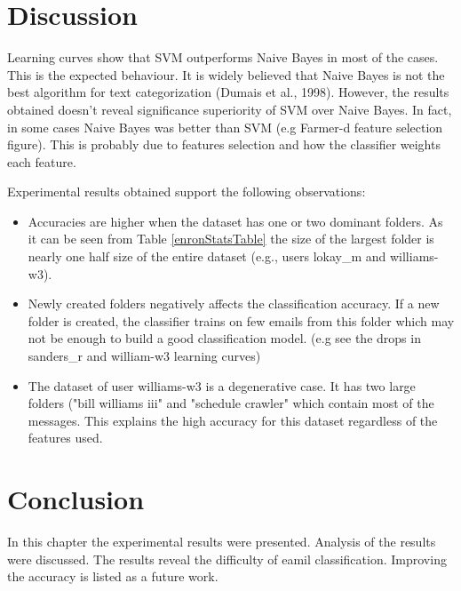 \section{Discussion}
Learning curves show that SVM outperforms Naive Bayes in most of the cases. This is the expected behaviour. It is widely believed that Naive Bayes is not the best algorithm for text categorization (Dumais et al., 1998)\cite{DHS98}.
However, the results obtained doesn't reveal significance superiority of SVM over Naive Bayes. In fact, in some cases Naive Bayes was better than SVM (e.g Farmer-d feature selection figure). This is probably due to features selection and how the classifier weights each feature.


Experimental results obtained support the following observations:
\begin{itemize}
\item Accuracies are higher when the dataset has one or two dominant folders. As it can be seen from Table \ref{enronStatsTable}
 the size of the largest folder is nearly one half size of the entire dataset (e.g., users lokay\_m and williams-w3).

\item Newly created folders negatively affects the classification accuracy. If a new folder is created, the classifier trains on few emails from this folder which may not be enough to build a good classification model. (e.g see the drops in sanders\_r and william-w3 learning curves)

\item The dataset of user williams-w3 is a degenerative case. It has two large folders ("bill williams iii" and "schedule crawler" which contain most of the messages. This explains the high accuracy for this dataset regardless of the features used.

\end{itemize}

\section{Conclusion}
In this chapter the experimental results were presented. Analysis of the results were discussed. The results reveal the difficulty of eamil classification. Improving the accuracy is listed as a future work.


